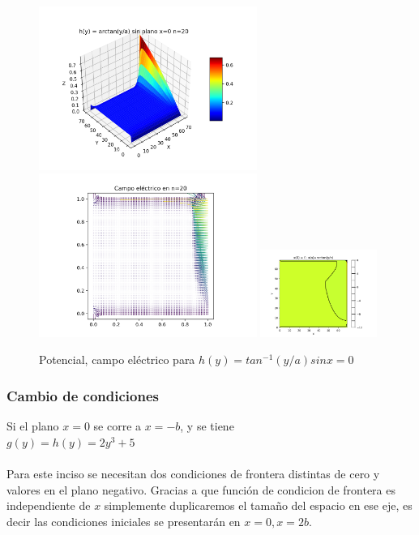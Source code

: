 \documentclass[10pt,journal,compsoc]{IEEEtran}
\begin{document}
\begin{figure}
  \centering
  \includegraphics[width=2.8in]{images/arctan-alt-n20}
  \includegraphics[width=2.8in]{images/arctan-alt-field}
  \includegraphics[width=1.5in]{images/arctan-alt-density}
  \caption{Potencial, campo eléctrico para \(h(y) = tan^{-1}(y/a) sin x=0\)}
  \label{arctan-n20}
\end{figure}


\pagebreak

\subsubsection{Cambio de condiciones}

Si el plano \(x=0\) se corre a \(x=-b\), y se tiene
\\
\(g(y)=h(y)=2y^3+5\) 
\\\\
Para este inciso se necesitan dos condiciones de frontera distintas de cero y valores en el plano negativo.
Gracias a que función de condicion de frontera es independiente de \(x\) simplemente duplicaremos el tamaño del
espacio en ese eje, es decir las condiciones iniciales se presentarán en \(x=0, x=2b\).
\end{document}
